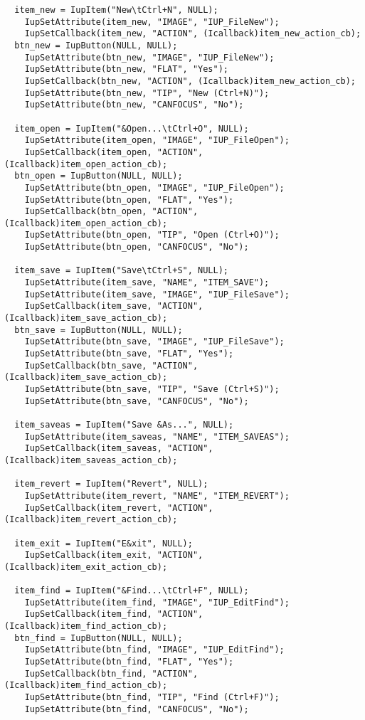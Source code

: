 \documentclass{ctexart}
\begin{document}
\begin{lstlisting}
  item_new = IupItem("New\tCtrl+N", NULL);
    IupSetAttribute(item_new, "IMAGE", "IUP_FileNew");
    IupSetCallback(item_new, "ACTION", (Icallback)item_new_action_cb);
  btn_new = IupButton(NULL, NULL);
    IupSetAttribute(btn_new, "IMAGE", "IUP_FileNew");
    IupSetAttribute(btn_new, "FLAT", "Yes");
    IupSetCallback(btn_new, "ACTION", (Icallback)item_new_action_cb);
    IupSetAttribute(btn_new, "TIP", "New (Ctrl+N)");
    IupSetAttribute(btn_new, "CANFOCUS", "No");

  item_open = IupItem("&Open...\tCtrl+O", NULL);
    IupSetAttribute(item_open, "IMAGE", "IUP_FileOpen");
    IupSetCallback(item_open, "ACTION", (Icallback)item_open_action_cb);
  btn_open = IupButton(NULL, NULL);
    IupSetAttribute(btn_open, "IMAGE", "IUP_FileOpen");
    IupSetAttribute(btn_open, "FLAT", "Yes");
    IupSetCallback(btn_open, "ACTION", (Icallback)item_open_action_cb);
    IupSetAttribute(btn_open, "TIP", "Open (Ctrl+O)");
    IupSetAttribute(btn_open, "CANFOCUS", "No");

  item_save = IupItem("Save\tCtrl+S", NULL);
    IupSetAttribute(item_save, "NAME", "ITEM_SAVE");
    IupSetAttribute(item_save, "IMAGE", "IUP_FileSave");
    IupSetCallback(item_save, "ACTION", (Icallback)item_save_action_cb);
  btn_save = IupButton(NULL, NULL);
    IupSetAttribute(btn_save, "IMAGE", "IUP_FileSave");
    IupSetAttribute(btn_save, "FLAT", "Yes");
    IupSetCallback(btn_save, "ACTION", (Icallback)item_save_action_cb);
    IupSetAttribute(btn_save, "TIP", "Save (Ctrl+S)");
    IupSetAttribute(btn_save, "CANFOCUS", "No");

  item_saveas = IupItem("Save &As...", NULL);
    IupSetAttribute(item_saveas, "NAME", "ITEM_SAVEAS");
    IupSetCallback(item_saveas, "ACTION", (Icallback)item_saveas_action_cb);

  item_revert = IupItem("Revert", NULL);
    IupSetAttribute(item_revert, "NAME", "ITEM_REVERT");
    IupSetCallback(item_revert, "ACTION", (Icallback)item_revert_action_cb);
    
  item_exit = IupItem("E&xit", NULL);
    IupSetCallback(item_exit, "ACTION", (Icallback)item_exit_action_cb);

  item_find = IupItem("&Find...\tCtrl+F", NULL);
    IupSetAttribute(item_find, "IMAGE", "IUP_EditFind");
    IupSetCallback(item_find, "ACTION", (Icallback)item_find_action_cb);
  btn_find = IupButton(NULL, NULL);
    IupSetAttribute(btn_find, "IMAGE", "IUP_EditFind");
    IupSetAttribute(btn_find, "FLAT", "Yes");
    IupSetCallback(btn_find, "ACTION", (Icallback)item_find_action_cb);
    IupSetAttribute(btn_find, "TIP", "Find (Ctrl+F)");
    IupSetAttribute(btn_find, "CANFOCUS", "No");


\end{lstlisting}
\end{document}
